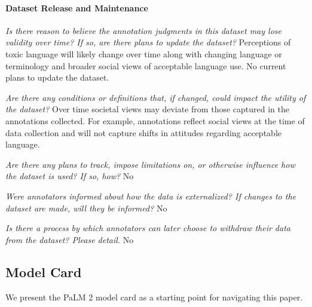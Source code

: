 \paragraph{Dataset Release and Maintenance}
\textit{Is there reason to believe the annotation judgments in this dataset may lose validity over time? If so, are there plans to update the dataset?}
Perceptions of toxic language will likely change over time along with changing language or terminology and broader social views of acceptable language use. No current plans to update the dataset.

\textit{Are there any conditions or definitions that, if changed, could impact the utility of the dataset?}
Over time societal views may deviate from those captured in the annotations collected. For example, annotations reflect social views at the time of data collection and will not capture shifts in attitudes regarding acceptable language.

\textit{Are there any plans to track, impose limitations on, or otherwise influence how the dataset is used? If so, how?}
No

\textit{Were annotators informed about how the data is externalized? If changes to the dataset are made, will they be informed?}
No

\textit{Is there a process by which annotators can later choose to withdraw their data from the dataset? Please detail.}
No 
\pagebreak
\subsection{Model Card}
We present the PaLM 2 model card \cite{mitchell2019model} as a starting point for navigating this paper.



